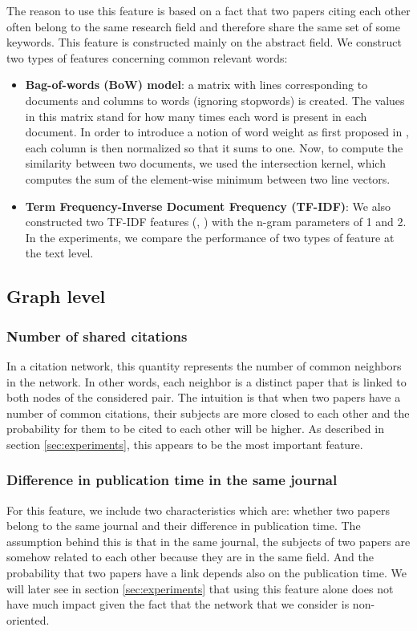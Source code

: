 \documentclass{article}
\begin{document}
The reason to use this feature is based on a fact that two papers citing each other often belong to the same research field and therefore share the same set of some keywords. This feature is constructed mainly on the abstract field. We construct two types of features concerning common relevant words:
\begin{itemize}
\item \textbf{Bag-of-words (BoW) model}: a matrix with lines corresponding to documents and columns to words (ignoring stopwords) is created. The values in this matrix stand for how many times each word is present in each document. In order to introduce a notion of word weight as first proposed in \cite{sparck1972statistical}, each column is then normalized so that it sums to one. Now, to compute the similarity between two documents, we used the intersection kernel, which computes the sum of the element-wise minimum between two line vectors.
\item \textbf{Term Frequency-Inverse Document Frequency (TF-IDF)}: We also constructed two TF-IDF features (\cite{Singhal:1996}, \cite{Wu:2008}) with the n-gram parameters of 1 and 2. In the experiments, we compare the performance of two types of feature at the text level.
\end{itemize}
\subsection{Graph level}
\subsubsection{Number of shared citations}

In a citation network, this quantity represents the number of common neighbors in the network. In other words, each neighbor is a distinct paper that is linked to both nodes of the considered pair. The intuition is that when two papers have a number of common citations, their subjects are more closed to each other and the probability for them to be cited to each other will be higher. As described in section \ref{sec:experiments}, this appears to be the most important feature.

\subsubsection{Difference in publication time in the same journal}

For this feature, we include two characteristics which are: whether two papers belong to the same journal and their difference in publication time. The assumption behind this is that in the same journal, the subjects of two papers are somehow related to each other because they are in the same field. And the probability that two papers have a link depends also on the publication time. We will later see in section \ref{sec:experiments} that using this feature alone does not have much impact given the fact that the network that we consider is non-oriented.
\end{document}
